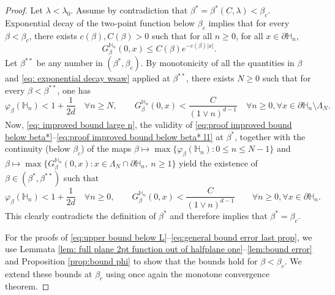 \documentclass[11pt,a4paper]{article}
\numberwithin{equation}{section}
\theoremstyle{plain}
\theoremstyle{definition}
\begin{document}
\begin{proof}
Let $\lambda<\lambda_0$. Assume by contradiction that $\beta^*=\beta^*(C,\lambda)<\beta_c$. Exponential decay of the two-point function below $\beta_c$ implies that for every $\beta<\beta_c$, there exists $c(\beta),C(\beta)>0$ such that for all $n\geq 0$, for all $x\in \partial \mathbb H_n$,
\begin{equation}\label{eq: exponential decay wsaw}
	G^{\mathbb H_n}_\beta(0,x)\leq C(\beta)e^{-c(\beta)|x|}.
\end{equation}
Let $\beta^{**}$ be any number in $(\beta^*,\beta_c)$. By monotonicity of all the quantities in $\beta$ and \eqref{eq: exponential decay wsaw} applied at $\beta^{**}$, there exists $N\ge 0$ such that for every $\beta<\beta^{**}$, one has
\begin{equation}\label{eq: improved bound large n}
	\varphi_{\beta}(\mathbb H_n)<1+\frac{1}{2d}\quad \forall n\geq N, \qquad G_\beta^{\mathbb H_n}(0,x)<\frac{C}{(1\vee n)^{d-1}}\quad \forall n\geq 0, \forall x\in \partial \mathbb H_n\setminus \Lambda_N.
\end{equation}
Now, \eqref{eq: improved bound large n}, the validity of \eqref{eq:proof improved bound below beta*}--\eqref{eq:proof improved bound below beta* l1} at $\beta^*$, together with the continuity (below $\beta_c$) of the maps $\beta\mapsto \max\{\varphi_\beta(\mathbb H_n):0\leq n \leq N-1\}$ and $\beta\mapsto \max\{G_\beta^{\mathbb H_n}(0,x):x\in \Lambda_{N}\cap \partial \mathbb H_n, \: n\geq 1\}$ yield the existence of $\beta\in(\beta^*,\beta^{**})$ such that
\begin{equation}
	\varphi_\beta(\mathbb H_n)<1+\frac{1}{2d} \quad \forall n\geq 0, \qquad G_\beta^{\mathbb H_n}(0,x)<\frac{C}{(1\vee n)^{d-1}} \qquad \forall n\geq 0, \forall x\in \partial \mathbb H_n.
\end{equation}
This clearly contradicts the definition of $\beta^*$ and therefore implies that $\beta^*=\beta_c$.

For the proofs of \eqref{eq:upper bound below L}--\eqref{eq:general bound error last prop}, we use Lemmata \ref{lem: full plane 2pt function out of halfplane one}--\ref{lem:bound error} and Proposition \ref{prop:bound phi} to show that the bounds hold for $\beta<\beta_c$. We extend these bounds at $\beta_c$ using once again the monotone convergence theorem.
\end{proof}
\end{document}
